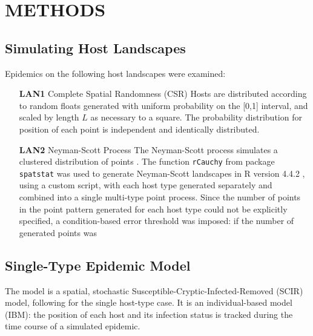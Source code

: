 \documentclass[prstpaper]{revtex4-2}
\begin{document}
\section*{METHODS}
\subsection*{Simulating Host Landscapes}


Epidemics on the following host landscapes were examined:

\begin{itemize}
\item[\textbf{LAN1}] Complete Spatial Randomness (CSR) 
\newline
\label{LAN1}
    Hosts are distributed according to random floats generated with uniform probability on the [0,1] interval, and scaled by length $L$ as necessary to a square. The probability distribution for position of each point is independent and identically distributed. 
    
\item[\textbf{LAN2}]  Neyman-Scott Process \label{LAN2}
\newline
    The Neyman-Scott process simulates a clustered distribution of points \cite{vandenBosch2024}. The function \texttt{rCauchy} from package \texttt{spatstat} \cite{Baddeley2015} was used to generate Neyman-Scott landscapes in R version 4.4.2 \cite{RCoreTeam}, using a custom script, with each host type generated separately and combined into a single multi-type point process. Since the number of points in the point pattern generated for each host type could not be explicitly specified, a condition-based error threshold was imposed: if the number of generated points was 
    \end{itemize}

\subsection*{Single-Type Epidemic Model}

The model is a spatial, stochastic Susceptible-Cryptic-Infected-Removed (SCIR) model, following \cite{HyattTwynam2017} for the single host-type case. It is an individual-based model (IBM):  the position of each host and its infection status is tracked during the time course of a simulated epidemic.

\end{document}
